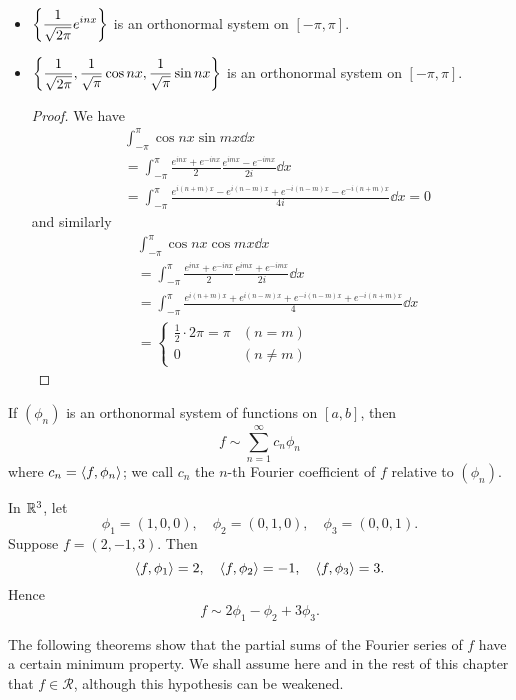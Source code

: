 \begin{example} \
\begin{itemize}
\item $\displaystyle\left\{\frac{1}{\sqrt{2\pi}}e^{inx}\right\}$ is an orthonormal system on $[-\pi,\pi]$.

\item $\displaystyle\left\{\frac{1}{\sqrt{2\pi}},\frac{1}{\sqrt{\pi}}\cos nx,\frac{1}{\sqrt{\pi}}\sin nx\right\}$ is an orthonormal system on $[-\pi,\pi]$.

\begin{proof}
We have
\begin{align*}
&\int_{-\pi}^{\pi}\cos nx\sin mx\dd{x}\\
&=\int_{-\pi}^{\pi}\frac{e^{inx}+e^{-inx}}{2}\frac{e^{imx}-e^{-imx}}{2i}\dd{x}\\
&=\int_{-\pi}^{\pi}\frac{e^{i(n+m)x}-e^{i(n-m)x}+e^{-i(n-m)x}-e^{-i(n+m)x}}{4i}\dd{x}=0
\end{align*}
and similarly
\begin{align*}
&\int_{-\pi}^{\pi}\cos nx\cos mx\dd{x}\\
&=\int_{-\pi}^{\pi}\frac{e^{inx}+e^{-inx}}{2}\frac{e^{imx}+e^{-imx}}{2i}\dd{x}\\
&=\int_{-\pi}^{\pi}\frac{e^{i(n+m)x}+e^{i(n-m)x}+e^{-i(n-m)x}+e^{-i(n+m)x}}{4}\dd{x}\\
&=\begin{cases}
\frac{1}{2}\cdot2\pi=\pi&(n=m)\\
0&(n\neq m)
\end{cases}
\end{align*}
\end{proof}
\end{itemize}
\end{example}

If $(\phi_n)$ is an orthonormal system of functions on $[a,b]$, then
\[f\sim\sum_{n=1}^{\infty}c_n\phi_n\]
where $c_n=\left\langle f,\phi_n\right\rangle$; we call $c_n$ the $n$-th Fourier coefficient of $f$ relative to $(\phi_n)$.

\begin{example}
In $\mathbb R^3$, let
\[\phi_1=(1,0,0),\quad\phi_2=(0,1,0),\quad\phi_3=(0,0,1).\]
Suppose $f=(2,-1,3)$. Then
\[\left\langle f,\phi_1\right\rangle=2,\quad\left\langle f,\phi_2\right\rangle=-1,\quad\left\langle f,\phi_3\right\rangle=3.\]
Hence
\[f\sim 2\phi_1-\phi_2+3\phi_3.\]
\end{example}

The following theorems show that the partial sums of the Fourier series of $f$ have a certain minimum property. We shall assume here and in the rest of this chapter that $f\in\mathcal{R}$, although this hypothesis can be weakened. 


